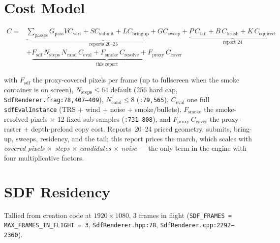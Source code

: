 \documentclass[11pt,a4paper]{article}
\begin{document}
\section{Cost Model}

\begin{equation}
\begin{aligned}
C = &\underbrace{\sum_{\mathrm{passes}} G_{\mathrm{pass}} V C_{\mathrm{vert}} + S C_{\mathrm{submit}} + L C_{\mathrm{bringup}} + G C_{\mathrm{sweep}}}_{\text{reports 20--23}} + \underbrace{P\,C_{\mathrm{tail}} + B\,C_{\mathrm{brush}} + K\,C_{\mathrm{equirect}}}_{\text{report 24}} \\
&+ \underbrace{F_{\mathrm{sdf}}\,N_{\mathrm{steps}}\,N_{\mathrm{cand}}\,C_{\mathrm{eval}} + F_{\mathrm{smoke}}\,C_{\mathrm{resolve}} + F_{\mathrm{proxy}}\,C_{\mathrm{cover}}}_{\text{this report}}
\end{aligned}
\end{equation}

with $F_{\mathrm{sdf}}$ the proxy-covered pixels per frame (up to fullscreen
when the smoke container is on screen), $N_{\mathrm{steps}} \le 64$ default
(256 hard cap, \texttt{SdfRenderer.frag:78,407--409}), $N_{\mathrm{cand}} \le 8$
(\texttt{:79,565}), $C_{\mathrm{eval}}$ one full \texttt{sdfEvalInstance}
(TRS + wind + noise + smoke/bullets), $F_{\mathrm{smoke}}$ the smoke-resolved
pixels $\times$ 12 fixed sub-samples (\texttt{:731--808}), and
$F_{\mathrm{proxy}}\,C_{\mathrm{cover}}$ the proxy-raster + depth-preload
copy cost. Reports~20--24 priced geometry, submits, bring-up, sweeps,
residency, and the tail; this report prices the march, which scales with
\emph{covered pixels $\times$ steps $\times$ candidates $\times$ noise} ---
the only term in the engine with four multiplicative factors.

\section{SDF Residency}
\label{sec:vram}

Tallied from creation code at $1920\times1080$, 3 frames in flight
(\texttt{SDF\_FRAMES = MAX\_FRAMES\_IN\_FLIGHT = 3},
\texttt{SdfRenderer.hpp:78}, \texttt{SdfRenderer.cpp:2292--2360}).
\end{document}
